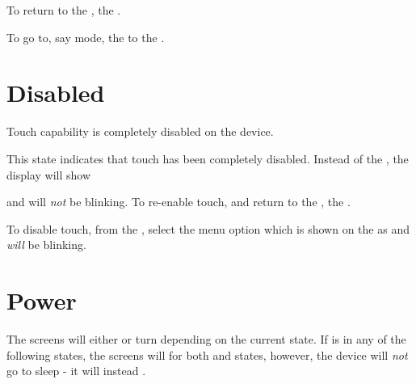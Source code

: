 \par\medskip

To return to the ,  the .


To go to, say  mode,  the  to the .


\pagebreak
\section{Disabled} 

Touch capability is completely disabled on the device.

\par\medskip

This state indicates that touch has been completely disabled.  Instead of the
, the display will show

\begin{figure}[H]
\centering
\end{figure}

and will \textit{not} be blinking.  To re-enable touch, and return to the
,  the .


To disable touch, from the , select the  menu option which
is shown on the  as  and \textit{will} be blinking.


\section{Power}

The screens will either  or turn  depending on the current
state.  If  is in any of the following states, the screens will
 for both  and  states, however, the device will
\textit{not} go to sleep - it will instead .

